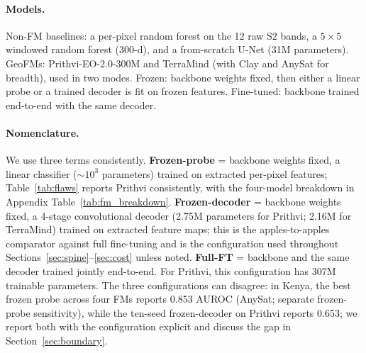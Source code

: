 \documentclass{article}
\begin{document}
\paragraph{Models.} Non-FM baselines: a per-pixel random forest on the 12 raw S2
bands, a $5\times5$ windowed random forest (300-d), and a from-scratch U-Net
\citep{unet} (31M parameters). GeoFMs: Prithvi-EO-2.0-300M \citep{prithvi} and
TerraMind \citep{terramind} (with Clay and AnySat for breadth), used in two modes.
Frozen: backbone weights fixed, then either a linear probe or a trained decoder is fit on frozen features.
Fine-tuned: backbone trained end-to-end with the same decoder.

\paragraph{Nomenclature.} We use three terms consistently. \textbf{Frozen-probe} =
backbone weights fixed, a linear classifier (${\sim}10^3$ parameters) trained on
extracted per-pixel features; Table~\ref{tab:flaws} reports Prithvi consistently,
with the four-model breakdown in Appendix Table~\ref{tab:fm_breakdown}.
\textbf{Frozen-decoder} = backbone
weights fixed, a 4-stage convolutional decoder (2.75M parameters for Prithvi;
2.16M for TerraMind) trained on
extracted feature maps; this is the apples-to-apples comparator against full
fine-tuning and is the configuration used throughout
Sections~\ref{sec:spine}--\ref{sec:cost} unless noted. \textbf{Full-FT} = backbone
and the same decoder trained jointly end-to-end. For Prithvi, this configuration
has 307M trainable parameters. The
three configurations can disagree: in Kenya, the best frozen probe across four FMs
reports 0.853 AUROC (AnySat; separate frozen-probe sensitivity), while the ten-seed
frozen-decoder on Prithvi reports 0.653; we report
both with the configuration explicit and discuss the gap in
Section~\ref{sec:boundary}.
\end{document}
